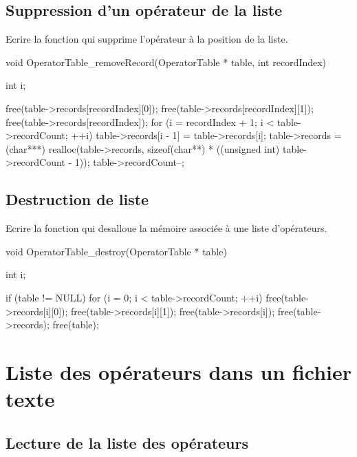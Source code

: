 \subsection{Suppression d'un opérateur de la liste}

Ecrire la fonction  qui supprime l'opérateur à la position  de la liste.

\begin{csourcecorrection}
void OperatorTable_removeRecord(OperatorTable * table, int recordIndex) {
    int i;

    free(table->records[recordIndex][0]);
    free(table->records[recordIndex][1]);
    free(table->records[recordIndex]);
    for (i = recordIndex + 1; i < table->recordCount; ++i) {
        table->records[i - 1] = table->records[i];
    }
    table->records = (char***) realloc(table->records, sizeof(char**)
            * ((unsigned int) table->recordCount - 1));
    table->recordCount--;
}
\end{csourcecorrection}

\subsection{Destruction de liste}

Ecrire la fonction  qui desalloue la mémoire associée à une liste d'opérateurs.

\begin{csourcecorrection}
void OperatorTable_destroy(OperatorTable * table) {
    int i;

    if (table != NULL) {
        for (i = 0; i < table->recordCount; ++i) {
            free(table->records[i][0]);
            free(table->records[i][1]);
            free(table->records[i]);
        }
        free(table->records);
        free(table);
    }
}
\end{csourcecorrection}

\section{Liste des opérateurs dans un fichier texte}

\subsection{Lecture de la liste des opérateurs}

